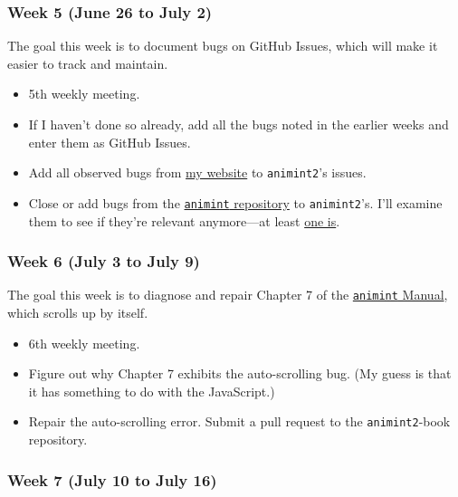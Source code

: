 \documentclass[
]{article}
\providecommand{\tightlist}{%
  \setlength{\itemsep}{0pt}\setlength{\parskip}{0pt}}\usepackage{longtable,booktabs,array}
\begin{document}
\hypertarget{week-5-june-26-to-july-2}{%
\subsubsection{Week 5 (June 26 to July
2)}\label{week-5-june-26-to-july-2}}

The goal this week is to document bugs on GitHub Issues, which will make
it easier to track and maintain.

\begin{itemize}
\tightlist
\item
  5th weekly meeting.
\item
  If I haven't done so already, add all the bugs noted in the earlier
  weeks and enter them as GitHub Issues.
\item
  Add all observed bugs from
  \href{https://gsoc.joss.cat/\#possible-bugs}{my website} to
  \texttt{animint2}'s issues.
\item
  Close or add bugs from the
  \href{https://github.com/tdhock/animint/issues}{\texttt{animint}
  repository} to \texttt{animint2}'s. I'll examine them to see if
  they're relevant anymore---at least
  \href{https://github.com/tdhock/animint/issues/150}{one is}.
\end{itemize}

\hypertarget{week-6-july-3-to-july-9}{%
\subsubsection{Week 6 (July 3 to July
9)}\label{week-6-july-3-to-july-9}}

The goal this week is to diagnose and repair Chapter 7 of the
\href{https://github.com/tdhock/animint-book}{\texttt{animint} Manual},
which scrolls up by itself.

\begin{itemize}
\tightlist
\item
  6th weekly meeting.
\item
  Figure out why Chapter 7 exhibits the auto-scrolling bug. (My guess is
  that it has something to do with the JavaScript.)
\item
  Repair the auto-scrolling error. Submit a pull request to the
  \texttt{animint2}-book repository.
\end{itemize}

\hypertarget{week-7-july-10-to-july-16}{%
\subsubsection{Week 7 (July 10 to July
16)}\label{week-7-july-10-to-july-16}}
\end{document}
